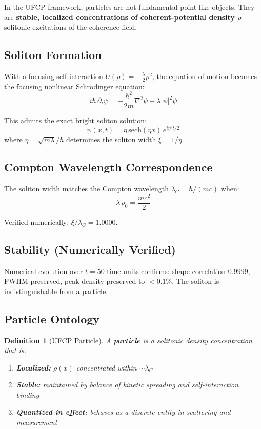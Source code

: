 \documentclass[11pt, a4paper]{article}
\newtheorem{definition}{Definition}[section]
\begin{document}
In the UFCP framework, particles are not fundamental point-like
objects. They are \textbf{stable, localized concentrations of
coherent-potential density $\rho$} --- solitonic excitations of
the coherence field.

\subsection{Soliton Formation}

With a focusing self-interaction
$U(\rho) = -\frac{\lambda}{2}\rho^2$, the equation of motion
becomes the focusing nonlinear Schr\"odinger equation:
\begin{equation}
  i\hbar\,\partial_t\psi =
  -\frac{\hbar^2}{2m}\nabla^2\psi - \lambda|\psi|^2\psi
\end{equation}

This admits the exact bright soliton solution:
\begin{equation}
  \psi(x,t) = \eta\,\mathrm{sech}(\eta x)\, e^{i\eta^2 t/2}
\end{equation}
where $\eta = \sqrt{m\lambda}/\hbar$ determines the soliton width
$\xi = 1/\eta$.

\subsection{Compton Wavelength Correspondence}

The soliton width matches the Compton wavelength
$\lambda_C = \hbar/(mc)$ when:
\begin{equation}
  \lambda\,\rho_0 = \frac{mc^2}{2}
\end{equation}

Verified numerically: $\xi/\lambda_C = 1.0000$.

\subsection{Stability (Numerically Verified)}

Numerical evolution over $t = 50$ time units confirms:
shape correlation $0.9999$, FWHM preserved, peak density preserved
to $< 0.1\%$. The soliton is indistinguishable from a particle.

\subsection{Particle Ontology}

\begin{definition}[UFCP Particle]
A \textbf{particle} is a solitonic density concentration that is:
\begin{enumerate}[nosep]
  \item \textbf{Localized:} $\rho(x)$ concentrated within
        $\sim\lambda_C$
  \item \textbf{Stable:} maintained by balance of kinetic spreading
        and self-interaction binding
  \item \textbf{Quantized in effect:} behaves as a discrete entity
        in scattering and measurement
\end{enumerate}
\end{definition}
\end{document}
